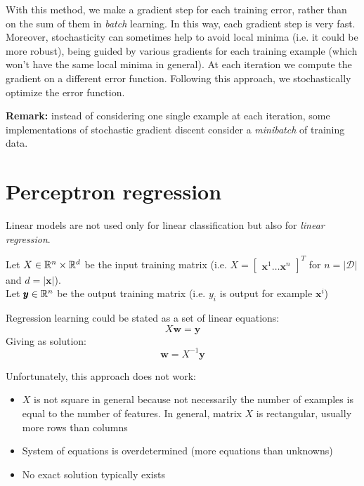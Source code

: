 With this method, we make a gradient step for each training error, rather than on the sum of them in \textit{batch} learning. In this way, each gradient step is very fast. Moreover, stochasticity can sometimes help to avoid local minima (i.e. it could be more robust), being guided by various gradients for each training example (which won't have the same local minima in general). At each iteration we compute the gradient on a different error function. Following this approach, we stochastically optimize the error function. \newline

\textbf{Remark:} instead of considering one single example at each iteration, some implementations of stochastic gradient discent consider a \textit{minibatch} of training data.

\section{Perceptron regression}
Linear models are not used only for linear classification but also for \textit{linear regression}. \newline

Let $X \in \mathbb{R}^n \times \mathbb{R}^d$ be the input training matrix (i.e. $X = \begin{bmatrix} \pmb{x}^1 \hdots \pmb{x}^n \end{bmatrix}^T$ for $n=|\mathcal{D}|$ and $d=|\pmb{x}|$).\\
Let $\pmb{y} \in \mathbb{R}^n$ be the output training matrix (i.e. $y_i$ is output for example $\pmb{x}^i$) \newline

Regression learning could be stated as a set of linear equations:
\begin{equation}
    X \pmb{w} = \pmb{y}
\end{equation}
Giving as solution:
\begin{equation}
    \pmb{w} = X^{-1} \pmb{y}
\end{equation}

Unfortunately, this approach does not work:

\begin{itemize}
    \item $X$ is not square in general because not necessarily the number of examples is equal to the number of features. In general, matrix $X$ is rectangular, usually more rows than columns
    
    \item System of equations is overdetermined (more equations than unknowns)
    
    \item No exact solution typically exists
\end{itemize}


